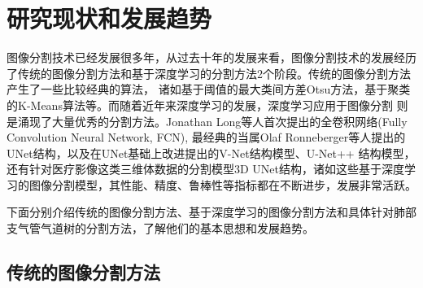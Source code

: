 \section{研究现状和发展趋势}


图像分割技术已经发展很多年，从过去十年的发展来看，图像分割技术的发展经历了传统的图像分割方法和基于深度学习的分割方法2个阶段。传统的图像分割方法产生了一些比较经典的算法，
诸如基于阈值的最大类间方差Otsu方法\cite{otsu1979threshold}，基于聚类的K-Means算法\cite{macqueen1965some}等。而随着近年来深度学习的发展，深度学习应用于图像分割
则是涌现了大量优秀的分割方法。Jonathan Long等人\cite{long2015fully}首次提出的全卷积网络(Fully Convolution Neural Network, FCN), 最经典的当属Olaf Ronneberger等人\cite{ronneberger2015u}提出的UNet结构，以及在UNet基础上改进提出的V-Net\cite{milletari2016v}结构模型、U-Net++\cite{zhou2019unet++}
结构模型，还有针对医疗影像这类三维体数据的分割模型3D UNet结构\cite{cciccek20163d}，诸如这些基于深度学习的图像分割模型，其性能、精度、鲁棒性等指标都在不断进步，发展非常活跃。

下面分别介绍传统的图像分割方法、基于深度学习的图像分割方法和具体针对肺部支气管气道树的分割方法，了解他们的基本思想和发展趋势。

	\subsection{传统的图像分割方法}
	
